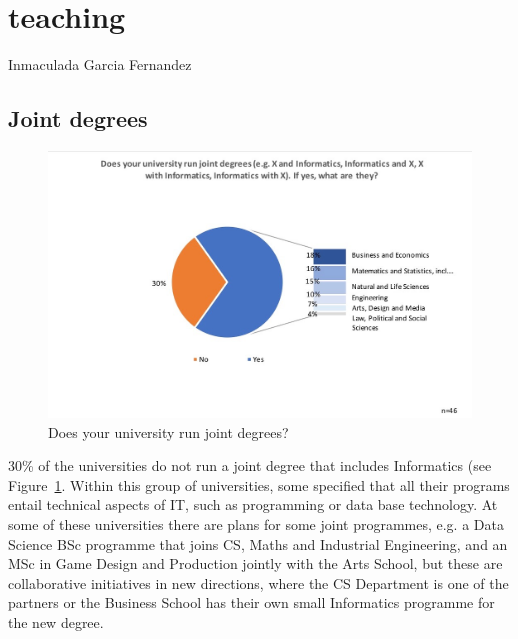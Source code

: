 \pagebreak
\section{teaching}

Inmaculada Garcia Fernandez
\subsection {Joint degrees}

\begin{figure}[h]
\includegraphics[width = \linewidth]{charts/2a.jpg}
\caption{Does your university run joint degrees?}
\label{sect3:joint}
\end{figure}

30\% of the universities do not run a joint degree that includes Informatics (see Figure~\ref{sect3:joint}. Within this group of universities, some specified that all their programs entail technical aspects of IT, such as programming or data base technology.  At some of these universities there are plans for some joint programmes, e.g. a Data Science BSc programme that joins CS, Maths and Industrial Engineering, and an MSc in Game Design and Production jointly with the Arts School, but these are collaborative initiatives in new directions, where the CS Department is one of the partners or the Business School has their own small Informatics programme for the new degree.

